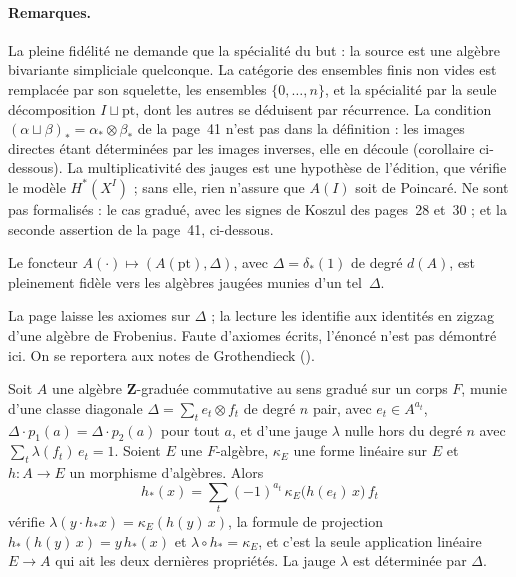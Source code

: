\paragraph{Remarques.} La pleine fidélité ne demande que la spécialité du but : la source est une algèbre bivariante simpliciale quelconque. La catégorie des ensembles finis non vides est remplacée par son squelette, les ensembles $\{0, \dots, n\}$, et la spécialité par la seule décomposition $I \sqcup \mathrm{pt}$, dont les autres se déduisent par récurrence. La condition $(\alpha \sqcup \beta)_* = \alpha_* \otimes \beta_*$ de la page~41 n'est pas dans la définition : les images directes étant déterminées par les images inverses, elle en découle (corollaire ci-dessous). La multiplicativité des jauges est une hypothèse de l'édition, que vérifie le modèle $H^*(X^I)$ ; sans elle, rien n'assure que $A(I)$ soit de Poincaré. Ne sont pas formalisés : le cas gradué, avec les signes de Koszul des pages~28 et~30 ; et la seconde assertion de la page~41, ci-dessous.

\begin{encadre}
\begin{conjecture*}
Le foncteur $A(\cdot) \mapsto (A(\mathrm{pt}), \Delta)$, avec $\Delta = \delta_*(1)$ de degré $d(A)$, est pleinement fidèle vers les algèbres jaugées munies d'un tel~$\Delta$.
\end{conjecture*}
\end{encadre}
{\small La page laisse  les axiomes sur $\Delta$ ; la lecture les identifie aux identités en zigzag d'une algèbre de Frobenius. Faute d'axiomes écrits, l'énoncé n'est pas démontré ici. On se reportera aux notes de Grothendieck ().\par}

\begin{enonce}
Soit $A$ une algèbre $\mathbf Z$-graduée commutative au sens gradué sur un corps $F$, munie d'une classe diagonale $\Delta = \sum_t e_t \otimes f_t$ de degré $n$ pair, avec $e_t \in A^{a_t}$, $\Delta \cdot p_1(a) = \Delta \cdot p_2(a)$ pour tout $a$, et d'une jauge $\lambda$ nulle hors du degré $n$ avec $\sum_t \lambda(f_t)\, e_t = 1$. Soient $E$ une $F$-algèbre, $\kappa_E$ une forme linéaire sur $E$ et $h : A \to E$ un morphisme d'algèbres. Alors
\[h_*(x) = \sum_t (-1)^{a_t}\, \kappa_E\bigl(h(e_t)\, x\bigr)\, f_t\]
vérifie $\lambda(y \cdot h_* x) = \kappa_E(h(y)\, x)$, la formule de projection $h_*(h(y)\, x) = y\, h_*(x)$ et $\lambda \circ h_* = \kappa_E$, et c'est la seule application linéaire $E \to A$ qui ait les deux dernières propriétés. La jauge $\lambda$ est déterminée par $\Delta$.
\end{enonce}

